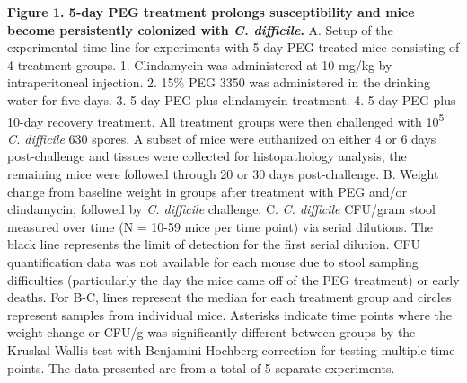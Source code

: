 \documentclass[
  11pt,
]{article}
\begin{document}
\textbf{Figure 1. 5-day PEG treatment prolongs susceptibility and mice
become persistently colonized with \emph{C. difficile}.} A. Setup of the
experimental time line for experiments with 5-day PEG treated mice
consisting of 4 treatment groups. 1. Clindamycin was administered at 10
mg/kg by intraperitoneal injection. 2. 15\% PEG 3350 was administered in
the drinking water for five days. 3. 5-day PEG plus clindamycin
treatment. 4. 5-day PEG plus 10-day recovery treatment. All treatment
groups were then challenged with 10\textsuperscript{5} \emph{C.
difficile} 630 spores. A subset of mice were euthanized on either 4 or 6
days post-challenge and tissues were collected for histopathology
analysis, the remaining mice were followed through 20 or 30 days
post-challenge. B. Weight change from baseline weight in groups after
treatment with PEG and/or clindamycin, followed by \emph{C. difficile}
challenge. C. \emph{C. difficile} CFU/gram stool measured over time (N =
10-59 mice per time point) via serial dilutions. The black line
represents the limit of detection for the first serial dilution. CFU
quantification data was not available for each mouse due to stool
sampling difficulties (particularly the day the mice came off of the PEG
treatment) or early deaths. For B-C, lines represent the median for each
treatment group and circles represent samples from individual mice.
Asterisks indicate time points where the weight change or CFU/g was
significantly different between groups by the Kruskal-Wallis test with
Benjamini-Hochberg correction for testing multiple time points. The data
presented are from a total of 5 separate experiments. \newpage
\end{document}

